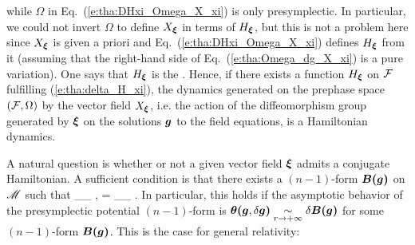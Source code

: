 while $\Omega$ in Eq.~(\ref{e:tha:DHxi_Omega_X_xi}) is
only presymplectic. In particular,
we could not invert $\Omega$ to define $X_{\bm{\xi}}$ in terms of $H_{\bm{\xi}}$,
but this is not a problem here since $X_{\bm{\xi}}$ is given a priori and Eq.~(\ref{e:tha:DHxi_Omega_X_xi}) defines $H_{\bm{\xi}}$ from it (assuming that the
right-hand side of Eq.~(\ref{e:tha:Omega_dg_X_xi}) is a
pure variation).
One says that $H_{\bm{\xi}}$ is the
\cite{WaldZ00}. Hence, if there exists a function $H_{\bm{\xi}}$ on $\mathcal{F}$
fulfilling (\ref{e:tha:delta_H_xi}),
the dynamics generated on the prephase space $(\mathcal{F},\Omega)$ by the vector field
$X_{\bm{\xi}}$, i.e. the action of the diffeomorphism group generated by
$\bm{\xi}$ on the solutions
$\bm{g}$ to the field equations, is a Hamiltonian dynamics.

A natural question is whether or not a given vector field
$\bm{\xi}$ admits a conjugate Hamiltonian. A sufficient condition
is that there exists a $(n-1)$-form $\bm{B}\textbf{(}\bm{g}\textbf{)}$ on $\mathscr{M}$
such that
\be \label{e:tha:int_xi_theta_B}
     \int_{\Sp_\infty} \!\! \w{\xi}\cdot\w{\theta}\lld{},\delta{}\rld
     = \delta \int_{\Sp_\infty} \!\! \w{\xi}\cdot{}\lld{}\rld .
\ee
In particular, this holds if the
asymptotic behavior of
the presymplectic potential $(n-1)$-form is
$\bm{\theta}\textbf{(}\bm{g},\delta\bm{g}\textbf{)}
    \underset{r\to +\infty}{\sim} \delta \bm{B}\textbf{(}\bm{g}\textbf{)}$
for some $(n-1)$-form $\bm{B}\textbf{(}\bm{g}\textbf{)}$. This is the case for general relativity:

